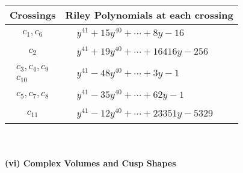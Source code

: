 \documentclass[1p]{elsarticle_modified}
\theoremstyle{definition}
\begin{document}
\begin{tabular}{m{50pt}|m{274pt}}
Crossings & \hspace{64pt}Riley Polynomials at each crossing \\
\hline $$\begin{aligned}c_{1},c_{6}\end{aligned}$$&$\begin{aligned}
&y^{41}+15 y^{40}+\cdots+8 y-16
\end{aligned}$\\
\hline $$\begin{aligned}c_{2}\end{aligned}$$&$\begin{aligned}
&y^{41}+19 y^{40}+\cdots+16416 y-256
\end{aligned}$\\
\hline $$\begin{aligned}c_{3},c_{4},c_{9}\\c_{10}\end{aligned}$$&$\begin{aligned}
&y^{41}-48 y^{40}+\cdots+3 y-1
\end{aligned}$\\
\hline $$\begin{aligned}c_{5},c_{7},c_{8}\end{aligned}$$&$\begin{aligned}
&y^{41}-35 y^{40}+\cdots+62 y-1
\end{aligned}$\\
\hline $$\begin{aligned}c_{11}\end{aligned}$$&$\begin{aligned}
&y^{41}-12 y^{40}+\cdots+23351 y-5329
\end{aligned}$\\
\hline
\end{tabular}\\~\\
\newpage\flushleft \textbf{(vi) Complex Volumes and Cusp Shapes}
\end{document}
